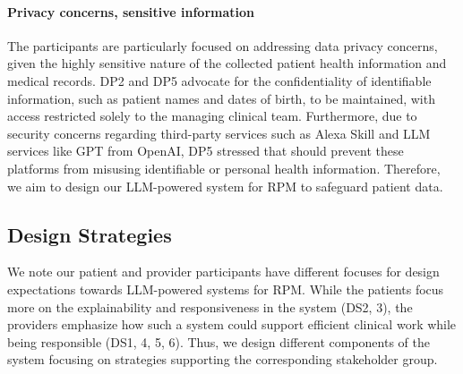 \paragraph{Privacy concerns, sensitive information}
\label{3-PD-finding-privacy}
The participants are particularly focused on addressing data privacy concerns, given the highly sensitive nature of the collected patient health information and medical records. DP2 and DP5 advocate for the confidentiality of identifiable information, such as patient names and dates of birth, to be maintained, with access restricted solely to the managing clinical team. 
Furthermore, due to security concerns regarding third-party services such as Alexa Skill and LLM services like GPT from OpenAI, DP5 stressed that \projectname{} should prevent these platforms from misusing identifiable or personal health information. Therefore, we aim to design our LLM-powered system for RPM to safeguard patient data.


\subsection{Design Strategies}
\label{3-PD-design-stategies}
We note our patient and provider participants have different focuses for design expectations towards LLM-powered systems for RPM. While the patients focus more on the explainability and responsiveness in the system (DS2, 3), the providers emphasize how such a system could support efficient clinical work while being responsible (DS1, 4, 5, 6). Thus, we design different components of the system focusing on strategies supporting the corresponding stakeholder group. 

